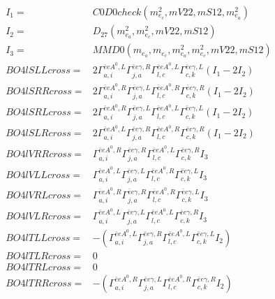 \documentclass[A4,landscape]{article}
\begin{document}
\begin{align} 
I_1 = & C0D0check(m^2_{e_{{c}}}, mV22, mS12, m^2_{e_{{a}}}) \\ 
I_2 = & D_{27}(m^2_{e_{{a}}}, m^2_{e_{{c}}}, mV22, mS12) \\ 
I_3 = & MMD0(m_{e_{{a}}}, m_{e_{{c}}}, m^2_{e_{{a}}}, m^2_{e_{{c}}}, mV22, mS12) \\ 
  BO4lSLLcross= & 2  \Gamma^{\bar{e}e A^0 ,L}_{a, i} \Gamma^{\bar{e}e \gamma ,R}_{j, a} \Gamma^{\bar{e}e A^0 ,L}_{l, c} \Gamma^{\bar{e}e \gamma ,L}_{c, k} (I_1 - 2 I_2) \\ 
  BO4lSRRcross= & 2  \Gamma^{\bar{e}e A^0 ,R}_{a, i} \Gamma^{\bar{e}e \gamma ,L}_{j, a} \Gamma^{\bar{e}e A^0 ,R}_{l, c} \Gamma^{\bar{e}e \gamma ,R}_{c, k} (I_1 - 2 I_2) \\ 
  BO4lSRLcross= & 2  \Gamma^{\bar{e}e A^0 ,R}_{a, i} \Gamma^{\bar{e}e \gamma ,L}_{j, a} \Gamma^{\bar{e}e A^0 ,L}_{l, c} \Gamma^{\bar{e}e \gamma ,L}_{c, k} (I_1 - 2 I_2) \\ 
  BO4lSLRcross= & 2  \Gamma^{\bar{e}e A^0 ,L}_{a, i} \Gamma^{\bar{e}e \gamma ,R}_{j, a} \Gamma^{\bar{e}e A^0 ,R}_{l, c} \Gamma^{\bar{e}e \gamma ,R}_{c, k} (I_1 - 2 I_2) \\ 
  BO4lVRRcross= &  \Gamma^{\bar{e}e A^0 ,R}_{a, i} \Gamma^{\bar{e}e \gamma ,R}_{j, a} \Gamma^{\bar{e}e A^0 ,L}_{l, c} \Gamma^{\bar{e}e \gamma ,R}_{c, k} I_3 \\ 
  BO4lVLLcross= &  \Gamma^{\bar{e}e A^0 ,L}_{a, i} \Gamma^{\bar{e}e \gamma ,L}_{j, a} \Gamma^{\bar{e}e A^0 ,R}_{l, c} \Gamma^{\bar{e}e \gamma ,L}_{c, k} I_3 \\ 
  BO4lVRLcross= &  \Gamma^{\bar{e}e A^0 ,R}_{a, i} \Gamma^{\bar{e}e \gamma ,R}_{j, a} \Gamma^{\bar{e}e A^0 ,R}_{l, c} \Gamma^{\bar{e}e \gamma ,L}_{c, k} I_3 \\ 
  BO4lVLRcross= &  \Gamma^{\bar{e}e A^0 ,L}_{a, i} \Gamma^{\bar{e}e \gamma ,L}_{j, a} \Gamma^{\bar{e}e A^0 ,L}_{l, c} \Gamma^{\bar{e}e \gamma ,R}_{c, k} I_3 \\ 
  BO4lTLLcross= & -( \Gamma^{\bar{e}e A^0 ,L}_{a, i} \Gamma^{\bar{e}e \gamma ,R}_{j, a} \Gamma^{\bar{e}e A^0 ,L}_{l, c} \Gamma^{\bar{e}e \gamma ,L}_{c, k} I_2) \\ 
  BO4lTLRcross= & 0 \\ 
  BO4lTRLcross= & 0 \\ 
  BO4lTRRcross= & -( \Gamma^{\bar{e}e A^0 ,R}_{a, i} \Gamma^{\bar{e}e \gamma ,L}_{j, a} \Gamma^{\bar{e}e A^0 ,R}_{l, c} \Gamma^{\bar{e}e \gamma ,R}_{c, k} I_2) \\ 
\end{align} 
\end{document}

